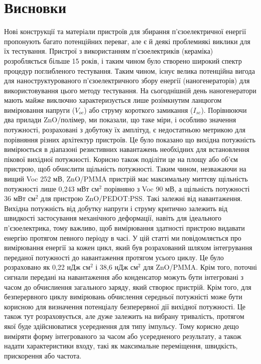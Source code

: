 \documentclass[a4paper,14pt]{extreport}
\begin{document}
\chapter{Висновки}\par 
Нові конструкції та матеріали  пристроїв для збирання п'єзоелектричної енергії
 пропонують багато потенційних переваг, але є й деякі проблемиякі  виклики для їх
тестування. Пристрої з використанням п'єзоелектриків
(кераміка) розробляється більше 15 років, і таким чином 
було створено широкий спектр процедур поглибленого тестування. Таким чином, існує велика потенційна вигода для наноструктурованого п’єзоелектричного збору енергії (наногенераторів) для
використовування цього методу тестування. На сьогоднішній день наногенератори мають
майже виключно характеризується лише розімкнутим ланцюгом
вимірювання напруги ($V_{oc}$) або струму короткого замикання ($I_{sc}$). Порівнюючи два прилади ZnO/полімер, ми показали, що таке
міри, і особливо значення потужності, розраховані з
добутоку їх амплітуд, є недостатньою метрикою для
порівняння різних архітектур пристроїв. Це було показано
що вихідна потужність вимірюється в діапазоні резистивних навантажень
необхідних для встановлення пікової вихідної потужності. Корисно також
поділіти це на площу або об’єм пристрою, щоб обчислити щільність потужності.
Таким чином, незважаючи на вищий Voc 252 мВ, ZnO/PMMA
пристрій має максимальну миттєву щільність потужності лише
0,243 мВт $\text{см}^2$ порівняно з Voc 90 мВ, а щільність потужності
36 мВт $\text{см}^2$ для пристрою ZnO/PEDOT:PSS. Такі залежні від навантаження.\\ 

Вихідна потужність від добутку напруги і струму 
критично залежить від швидкості застосування механічного
деформації, навіть для ідеального п'єзоелектрика, тому важливо, щоб
вимірювання здатності пристрою видавати енергію протягом певного періоду в 
часі. У цій статті ми повідомляється про вимірювання енергії за кожен 
цикл, який був розрахований шляхом інтегрування переданої потужності
до навантаження протягом усього циклу. Це було розраховано як
0,22 нДж $\text{см}^2$ і 38,6 нДж $\text{см}^2$ для ZnO/PMMA. Крім того, поточні сигнали
передані на навантаження або конденсатор можуть бути інтегровані з часом до
обчислиення загального заряду, який створює пристрій. Крім того,
для безперервного циклу вимірювань обчислення середньої
потужністі може бути корисною для визначення потенціалу безперервної дії
вихідної потужності. Це також тут розраховується, але дуже залежить
на вибрану тривалість, протягом якої буде здійснюватися усереднення для типу імпульсу. Тому корисно дещо виміряти
форму інтегрованого за часом або усередненого результату, а також надати характеристики входу, такі як максимальне переміщення,
швидкість, прискорення або частота.\\ 
\end{document}
